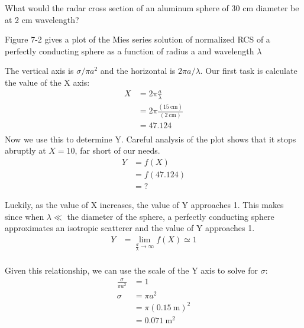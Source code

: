 \documentclass[12pt]{article}
\newenvironment{exercise}[2][Exercise]{\begin{trivlist}
    \item[\hskip \labelsep {\bfseries #1}\hskip \labelsep {\bfseries #2.}]}{\end{trivlist}}
\begin{document}
      \begin{exercise}{12}
      What would the radar cross section of an aluminum sphere of 30 cm diameter be at 2 cm wavelength?
      
      Figure 7-2 \cite[p.~248]{POMR} gives a plot of the Mies series solution of normalized RCS of a perfectly conducting sphere as a function of radius a and wavelength $\lambda$
      
      The vertical axis is $\sigma/\pi a^{2}$ and the horizontal is $2\pi a / \lambda$. Our first task is calculate the value of the X axis:
      \begin{align*}
      X & = 2\pi\frac{ a}{\lambda}\\
      & = 2\pi\frac{(\SI{15}{\cm})}{(\SI{2}{\cm})}\\
      & = 47.124\\
      \end{align*}
      Now we use this to determine Y. Careful analysis of the plot shows that it stops abruptly at $X = 10$, far short of our needs. 
      \begin{align*}
      Y &= f(X) \\
      & = f(47.124)\\
      & = ?
      \end{align*}

      Luckily, as the value of X increases, the value of Y approaches 1. This makes since when $\lambda \ll$ the diameter of the sphere, a perfectly conducting sphere approximates an isotropic scatterer and the value of Y approaches 1.
      \begin{align*}
      Y &= \lim_{\frac{d}{\lambda}\to\infty} f(X) \simeq 1\\
      \end{align*}
      
      Given this relationship, we can use the scale of the Y axis to solve for $\sigma$:
      \begin{align*}
      \frac{\sigma}{\pi a^{2}} & = 1 \\
      \sigma & = \pi a^{2}\\
      & = \pi (\SI{0.15}{\meter})^{2}\\
      & = \SI{0.071}{\meter\squared}
      \end{align*}
      \end{exercise}
      
\end{document}
